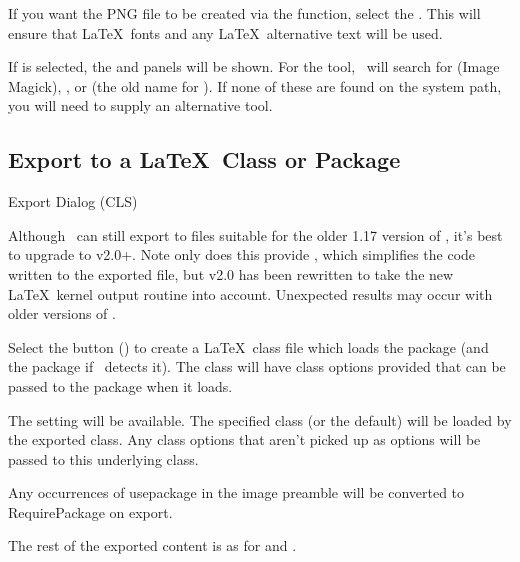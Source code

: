 If you want the PNG file to be created via the
 function, select the
. This will ensure that \LaTeX\ fonts and
any \LaTeX\ alternative text will be used.


If  is selected, the 
and  panels will be shown. 
For the  tool, \FlowframTk\ will search
for  (Image Magick), , or
 (the old name for ). If none of these are
found on the system path, you will need to supply an alternative
tool.

\subsection{Export to a \LaTeX\ Class or Package}\label{sec:exportsty}

 {}
 {Export Dialog (CLS)}

\begin{information}
Although \FlowframTk\ can still export to files suitable for
the older 1.17 version of , it's best to upgrade to
 v2.0+. Note only does this provide
, which simplifies the code written to the
exported file, but  v2.0 has been rewritten to take
the new \LaTeX\ kernel output routine into account.
Unexpected results may occur with older versions of .
\end{information}


Select the  button
() to create a \LaTeX\ class file
which loads the  package (and the
 package if \FlowframTk\ detects it).
The class will have class options provided that can be passed to the
 package when it loads.

The  setting will be available. The
specified class (or the default) will be loaded by the exported
class. Any class options that aren't picked up as 
options will be passed to this underlying class.

Any occurrences of \gls{usepackage} in the image
preamble will be converted to \gls{RequirePackage} on export.

The rest of the exported content is as for 
and .

